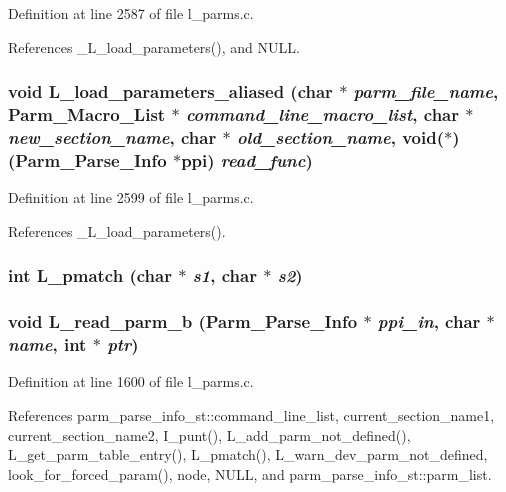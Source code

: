Definition at line 2587 of file l\_\-parms.c.

References \_\-L\_\-load\_\-parameters(), and NULL.
\subsubsection{\setlength{\rightskip}{0pt plus 5cm}void L\_\-load\_\-parameters\_\-aliased (char $\ast$ {\em parm\_\-file\_\-name}, \bf{Parm\_\-Macro\_\-List} $\ast$ {\em command\_\-line\_\-macro\_\-list}, char $\ast$ {\em new\_\-section\_\-name}, char $\ast$ {\em old\_\-section\_\-name}, void($\ast$)(\bf{Parm\_\-Parse\_\-Info} $\ast$ppi) {\em read\_\-func})}\label{l__parms_8h_bcb88cfb83d54c9c10936af2ca0c6155}




Definition at line 2599 of file l\_\-parms.c.

References \_\-L\_\-load\_\-parameters().
\subsubsection{\setlength{\rightskip}{0pt plus 5cm}int L\_\-pmatch (char $\ast$ {\em s1}, char $\ast$ {\em s2})}\label{l__parms_8h_4765bf6935180114326aeea11d1c65ae}


\subsubsection{\setlength{\rightskip}{0pt plus 5cm}void L\_\-read\_\-parm\_\-b (\bf{Parm\_\-Parse\_\-Info} $\ast$ {\em ppi\_\-in}, char $\ast$ {\em name}, int $\ast$ {\em ptr})}\label{l__parms_8h_5f83d604b2e536e100ebc2576bed22d3}




Definition at line 1600 of file l\_\-parms.c.

References parm\_\-parse\_\-info\_\-st::command\_\-line\_\-list, current\_\-section\_\-name1, current\_\-section\_\-name2, I\_\-punt(), L\_\-add\_\-parm\_\-not\_\-defined(), L\_\-get\_\-parm\_\-table\_\-entry(), L\_\-pmatch(), L\_\-warn\_\-dev\_\-parm\_\-not\_\-defined, look\_\-for\_\-forced\_\-param(), node, NULL, and parm\_\-parse\_\-info\_\-st::parm\_\-list.
